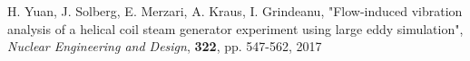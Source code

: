\documentclass[11pt,letterpaper,english]{article}
\begin{document}
H. Yuan, J. Solberg, E. Merzari, A. Kraus, I. Grindeanu, "Flow-induced vibration analysis of a helical coil steam generator experiment using large eddy simulation", \textit{Nuclear Engineering and Design}, \textbf{322}, pp. 547-562, 2017





\end{document}
